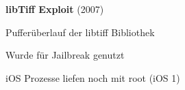 \begin{frame}
	\centering
	\textbf{libTiff Exploit} (2007)
	\begin{block}{}
		Pufferüberlauf der libtiff Bibliothek
	\end{block}
	\begin{block}{}
		Wurde für Jailbreak genutzt
	\end{block}
	\begin{block}{}
		iOS Prozesse liefen noch mit root (iOS 1)
	\end{block}
\end{frame}